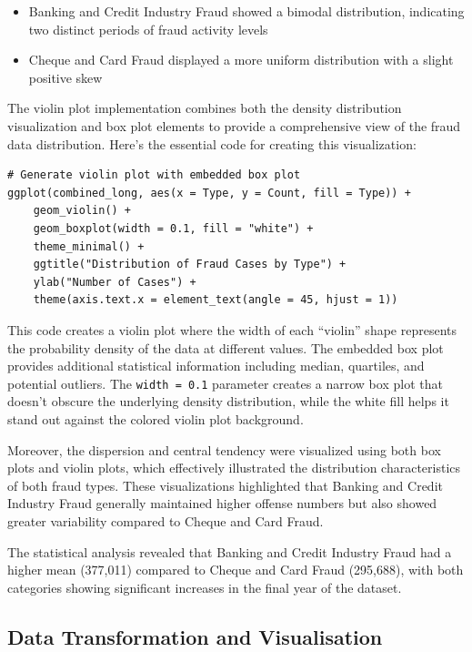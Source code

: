 \documentclass{article}
\begin{document}
\begin{enumerate}
    \begin{itemize}
        \item Banking and Credit Industry Fraud showed a bimodal distribution, indicating two distinct periods of fraud activity levels
        \item Cheque and Card Fraud displayed a more uniform distribution with a slight positive skew
    \end{itemize}
\end{enumerate}

The violin plot implementation combines both the density distribution visualization and box plot elements to provide a comprehensive view of the fraud data distribution. Here's the essential code for creating this visualization:

\begin{lstlisting}[style=RStyle, caption={Violin Plot Implementation}]
# Generate violin plot with embedded box plot
ggplot(combined_long, aes(x = Type, y = Count, fill = Type)) +
    geom_violin() +
    geom_boxplot(width = 0.1, fill = "white") +
    theme_minimal() +
    ggtitle("Distribution of Fraud Cases by Type") +
    ylab("Number of Cases") +
    theme(axis.text.x = element_text(angle = 45, hjust = 1))
\end{lstlisting}

This code creates a violin plot where the width of each ``violin'' shape represents the probability density of the data at different values. The embedded box plot provides additional statistical information including median, quartiles, and potential outliers. The \texttt{width = 0.1} parameter creates a narrow box plot that doesn't obscure the underlying density distribution, while the white fill helps it stand out against the colored violin plot background.

Moreover, the dispersion and central tendency were visualized using both box plots and violin plots, which effectively illustrated the distribution characteristics of both fraud types. These visualizations highlighted that Banking and Credit Industry Fraud generally maintained higher offense numbers but also showed greater variability compared to Cheque and Card Fraud.

The statistical analysis revealed that Banking and Credit Industry Fraud had a higher mean (377,011) compared to Cheque and Card Fraud (295,688), with both categories showing significant increases in the final year of the dataset.

\subsection{Data Transformation and Visualisation}
\end{document}
